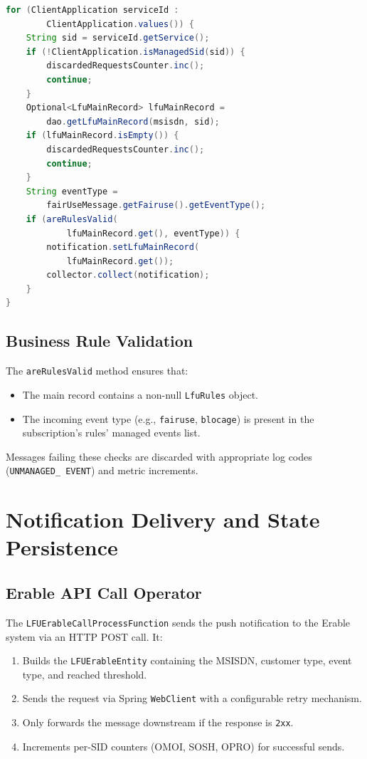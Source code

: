\begin{lstlisting}[language=Java, caption={Main record retrieval from Valkey}, breaklines=true]
for (ClientApplication serviceId :
        ClientApplication.values()) {
    String sid = serviceId.getService();
    if (!ClientApplication.isManagedSid(sid)) {
        discardedRequestsCounter.inc();
        continue;
    }
    Optional<LfuMainRecord> lfuMainRecord =
        dao.getLfuMainRecord(msisdn, sid);
    if (lfuMainRecord.isEmpty()) {
        discardedRequestsCounter.inc();
        continue;
    }
    String eventType =
        fairUseMessage.getFairuse().getEventType();
    if (areRulesValid(
            lfuMainRecord.get(), eventType)) {
        notification.setLfuMainRecord(
            lfuMainRecord.get());
        collector.collect(notification);
    }
}
\end{lstlisting}

\subsection{Business Rule Validation}

The \texttt{areRulesValid} method ensures that:
\begin{itemize}
    \item The main record contains a non-null \texttt{LfuRules} object.
    \item The incoming event type (e.g., \texttt{fairuse}, \texttt{blocage}) is present in the subscription's rules' managed events list.
\end{itemize}

Messages failing these checks are discarded with appropriate log codes (\texttt{UNMANAGED\_ EVENT}) and metric increments.

\section{Notification Delivery and State Persistence}

\subsection{Erable API Call Operator}

The \texttt{LFUErableCallProcessFunction} sends the push notification to the Erable system via an HTTP POST call. It:
\begin{enumerate}
    \item Builds the \texttt{LFUErableEntity} containing the MSISDN, customer type, event type, and reached threshold.
    \item Sends the request via Spring \texttt{WebClient} with a configurable retry mechanism.
    \item Only forwards the message downstream if the response is \texttt{2xx}.
    \item Increments per-SID counters (OMOI, SOSH, OPRO) for successful sends.
\end{enumerate}

